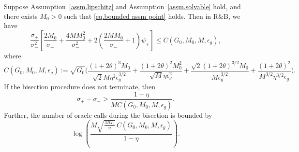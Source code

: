\documentclass{article}
\begin{document}
\begin{lemma}
    \label{coro.bisection bound}
    Suppose Assumption~\ref{assm.lipschitz} and
    Assumption~\ref{assm.solvable} hold, and there exists \(M_0>0\) such that
    \eqref{eq.bounded assm point} holds. Then in \textnormal{R\&B}, we have
    \begin{equation}
        \label{eq.bisection-coefficient-bound}
        \frac{\sigma_+}{\sigma_-^2}
        \left[
            \frac{2M_0}{\sigma_-}
            +
            \frac{4MM_0^2}{\sigma_-^2}
            +
            2\left(
            \frac{2MM_0}{\sigma_-}+1
            \right)\psi_+
            \right] \leq
        C(G_0,M_0,M,\epsilon_g),
    \end{equation}
    where
    \begin{equation}
        \label{eq.definition C bisection}
        C(G_0,M_0,M,\epsilon_g)
        :=
        \sqrt{G_0}\Bigg(
        \frac{(1+2\theta)^3M_0}
            {\sqrt{2}M\eta^2\epsilon_g^{3/2}}
        +
        \frac{(1+2\theta)^2M_0^2}
            {\sqrt{M}\eta\epsilon_g^2}
        +
        \frac{\sqrt{2}(1+2\theta)^{3/2}M_0}
            {M\epsilon_g^{3/2}}
        +
        \frac{(1+2\theta)^2}
            {M^{3/2}\eta^{3/2}\epsilon_g}
        \Bigg).
    \end{equation}
    If the bisection procedure does not terminate, then
    \begin{equation}
        \label{eq.bound value by brackets}
        \sigma_+-\sigma_-
        >
        \frac{1-\eta}
        {M C(G_0,M_0,M,\epsilon_g)}.
    \end{equation}
    Further, the number of oracle calls during the bisection is bounded by
    \begin{equation}
        \label{eq.bisection-oracle-bound}
        \log\left(
        \frac{
                M\sqrt{\frac{MG_0}{\eta}}\,
                C(G_0,M_0,M,\epsilon_g)
            }{
                1-\eta
            }
        \right).
    \end{equation}
\end{lemma}
\end{document}
